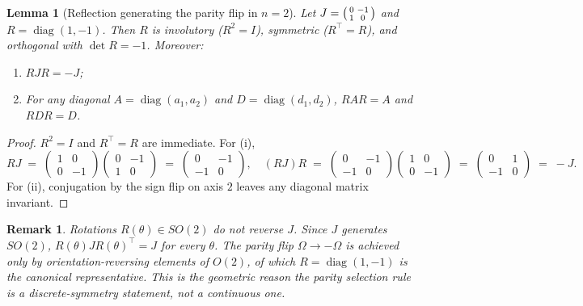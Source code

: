 \documentclass[%
 reprint,
 superscriptaddress,
 nofootinbib,
 nobibnotes,
 amsmath,amssymb,
 aps,
 prl,
 floatfix,
]{revtex4-2}
\DeclareMathOperator{\diag}{diag}
\newtheorem{lemma}{Lemma}
\newtheorem{remark}{Remark}
\begin{document}
\begin{lemma}[Reflection generating the parity flip in $n=2$]\label{lem:reflection}
Let $J = \begin{psmallmatrix}0 & -1 \\ 1 & 0\end{psmallmatrix}$ and $R = \diag(1, -1)$. Then $R$ is involutory ($R^2 = I$), symmetric ($R^\top = R$), and orthogonal with $\det R = -1$. Moreover:
\begin{enumerate}
\item[(i)] $R J R = -J$;
\item[(ii)] For any diagonal $A = \diag(a_1, a_2)$ and $D = \diag(d_1, d_2)$, $R A R = A$ and $R D R = D$.
\end{enumerate}
\end{lemma}
\begin{proof}
$R^2 = I$ and $R^\top = R$ are immediate. For (i),
\[
R J \;=\; \begin{pmatrix} 1 & 0 \\ 0 & -1 \end{pmatrix}\!\begin{pmatrix} 0 & -1 \\ 1 & 0 \end{pmatrix} \;=\; \begin{pmatrix} 0 & -1 \\ -1 & 0 \end{pmatrix},
\quad
(R J) R \;=\; \begin{pmatrix} 0 & -1 \\ -1 & 0 \end{pmatrix}\!\begin{pmatrix} 1 & 0 \\ 0 & -1 \end{pmatrix} \;=\; \begin{pmatrix} 0 & 1 \\ -1 & 0 \end{pmatrix} \;=\; -J.
\]
For (ii), conjugation by the sign flip on axis $2$ leaves any diagonal matrix invariant.
\end{proof}

\begin{remark}\label{rem:rotations-do-not-reverse}
Rotations $R(\theta) \in SO(2)$ do not reverse $J$. Since $J$ generates $SO(2)$, $R(\theta) J R(\theta)^\top = J$ for every $\theta$. The parity flip $\Omega \to -\Omega$ is achieved only by orientation-reversing elements of $O(2)$, of which $R = \diag(1,-1)$ is the canonical representative. This is the geometric reason the parity selection rule is a discrete-symmetry statement, not a continuous one.
\end{remark}
\end{document}
